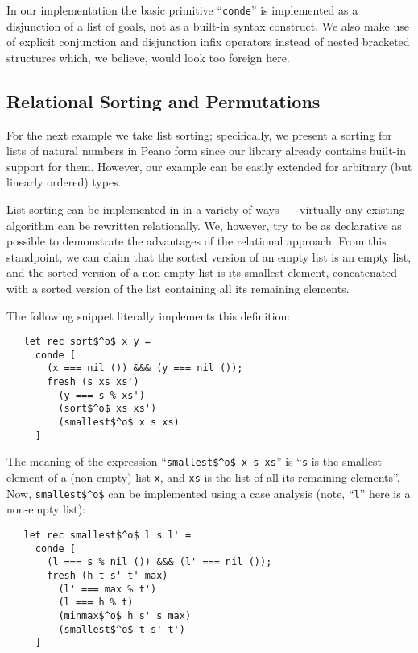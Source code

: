 In our implementation the basic \miniKanren primitive ``\lstinline{conde}'' is implemented as a
disjunction of a list of goals, not as a built-in syntax construct. We also make use of explicit
conjunction and disjunction infix operators instead of nested bracketed structures which, we
believe, would look too foreign here.

\subsection{Relational Sorting and Permutations}

For the next example we take list sorting; specifically, we present a sorting for lists of natural numbers
in Peano form since our library already contains built-in support for them. However, our example can be
easily extended for arbitrary (but linearly ordered) types.

List sorting can be implemented in \miniKanren in a variety of ways~--- virtually any existing algorithm can
be rewritten relationally. We, however, try to be as declarative as possible to demonstrate the
advantages of the relational approach. From this standpoint, we can claim that the sorted version of an empty list is an
empty list, and the sorted version of a non-empty list is its smallest element, concatenated with a sorted
version of the list containing all its remaining elements.

The following snippet literally implements this definition:

\begin{lstlisting}
   let rec sort$^o$ x y =
     conde [
       (x === nil ()) &&& (y === nil ());
       fresh (s xs xs')
         (y === s % xs')
         (sort$^o$ xs xs')
         (smallest$^o$ x s xs)
     ]
\end{lstlisting}

The meaning of the expression ``\lstinline|smallest$^o$ x s xs|'' is ``\lstinline|s| is the smallest element of a (non-empty) list \lstinline|x|, and \lstinline|xs| is the
list of all its remaining elements''. Now, \lstinline|smallest$^o$| can be implemented using a case analysis (note, ``\lstinline|l|'' here is a non-empty list):

\begin{lstlisting}
   let rec smallest$^o$ l s l' =
     conde [
       (l === s % nil ()) &&& (l' === nil ());
       fresh (h t s' t' max)
         (l' === max % t')
         (l === h % t)
         (minmax$^o$ h s' s max)
         (smallest$^o$ t s' t')
     ]
\end{lstlisting}

